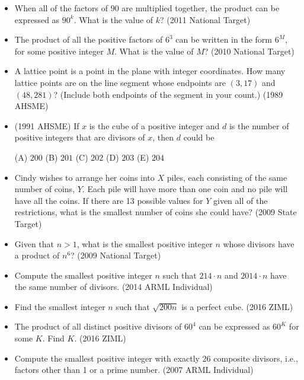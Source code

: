 \documentclass{article}
\begin{document}
\begin{itemize}
\item When all of the factors of $90$ are multiplied together, the product can be expressed as $90^k$. What is the value of $k$? (2011 National Target)

\item The product of all the positive factors of $6^3$ can be written in the form $6^M$, for some positive integer $M$. What is the value of $M$? (2010 National Target)

\item A lattice point is a point in the plane with integer coordinates. How many lattice points are on the line segment whose endpoints are $(3,17)$ and $(48,281)$? (Include both endpoints of the segment in your count.) (1989 AHSME)

\item (1991 AHSME)
If $x$ is the cube of a positive integer and $d$ is the number of positive integers that are divisors of $x$, then $d$ could be

(A) $200$  (B) $201$  (C) $202$  (D) $203$  (E) $204$

\item Cindy wishes to arrange her coins into $X$ piles, each consisting of the same number of coins, $Y$. Each pile will have more than one coin and no pile will have all the coins. If there are 13 possible values for $Y$ given all of the restrictions, what is the smallest number of coins she could have? (2009 State Target)

\item Given that $n>1$, what is the smallest positive integer $n$ whose divisors have a product of $n^6$? (2009 National Target)

\item Compute the smallest positive integer $n$ such that $214\cdot n$ and $2014\cdot n$ have the same number of divisors. (2014 ARML Individual)

\item Find the smallest integer $n$ such that $\sqrt{200n}$ is a perfect cube. (2016 ZIML)

\item The product of all distinct positive divisors of $60^4$ can be expressed as $60^K$ for some $K$. Find $K$. (2016 ZIML)

\item Compute the smallest positive integer with exactly 26 composite divisors, i.e., factors other than 1 or a prime number. (2007 ARML Individual)

\end{itemize}
\end{document}
